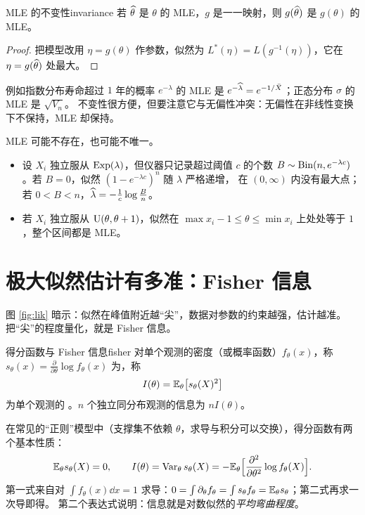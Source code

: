 \begin{proposition}{MLE 的不变性}{invariance}
若 $\widehat{\theta}$ 是 $\theta$ 的 MLE，$g$ 是一一映射，则 $g(\widehat{\theta})$ 是 $g(\theta)$ 的 MLE。
\end{proposition}
\begin{proof}
把模型改用 $\eta=g(\theta)$ 作参数，似然为 $L^*(\eta)=L(g^{-1}(\eta))$，它在 $\eta=g(\widehat{\theta})$ 处最大。
\end{proof}

例如指数分布寿命超过 $1$ 年的概率 $e^{-\lambda}$ 的 MLE 是 $e^{-\widehat{\lambda}}=e^{-1/\bar{X}}$；正态分布 $\sigma$ 的 MLE 是 $\sqrt{V_n}$。
不变性很方便，但要注意它与无偏性冲突：无偏性在非线性变换下不保持，MLE 却保持。

\begin{warning}
MLE 可能不存在，也可能不唯一。
\begin{itemize}
\item 设 $X_i$ 独立服从 $\operatorname{Exp}(\lambda)$，但仪器只记录超过阈值 $c$ 的个数 $B\sim\operatorname{Bin}(n,e^{-\lambda c})$。若 $B=0$，似然 $(1-e^{-\lambda c})^n$ 随 $\lambda$ 严格递增，
在 $(0,\infty)$ 内没有最大点；若 $0<B<n$，$\widehat{\lambda}=-\frac1c\log\frac Bn$。
\item 若 $X_i$ 独立服从 $\operatorname{U}(\theta,\theta+1)$，似然在 $\max x_i-1\le\theta\le\min x_i$ 上处处等于 $1$，整个区间都是 MLE。
\end{itemize}
\end{warning}

\section{极大似然估计有多准：Fisher 信息}

图 \ref{fig:lik} 暗示：似然在峰值附近越“尖”，数据对参数的约束越强，估计越准。把“尖”的程度量化，就是 Fisher 信息。

\begin{definition}{得分函数与 Fisher 信息}{fisher}
对单个观测的密度（或概率函数）$f_\theta(x)$，称 $s_\theta(x)=\frac{\partial}{\partial\theta}\log f_\theta(x)$ 为，称
\[
I(\theta)=\mathbb{E}_\theta\big[s_\theta(X)^2\big]
\]
为单个观测的 。$n$ 个独立同分布观测的信息为 $nI(\theta)$。
\end{definition}

在常见的“正则”模型中（支撑集不依赖 $\theta$，求导与积分可以交换），得分函数有两个基本性质：
\begin{equation}\label{eq:score}
\mathbb{E}_\theta s_\theta(X)=0,\qquad I(\theta)=\operatorname{Var}_\theta s_\theta(X)=-\mathbb{E}_\theta\Big[\frac{\partial^2}{\partial\theta^2}\log f_\theta(X)\Big].
\end{equation}
第一式来自对 $\int f_\theta(x)\dd x=1$ 求导：$0=\int\partial_\theta f_\theta=\int s_\theta f_\theta=\mathbb{E}_\theta s_\theta$；第二式再求一次导即得。
第二个表达式说明：信息就是对数似然的\emph{平均弯曲程度}。

